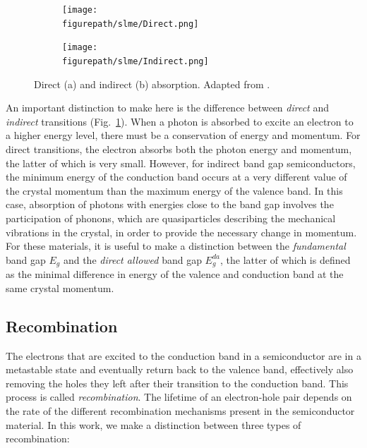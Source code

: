 \begin{refsection}
\begin{figure}[ht]  
\centering 
\begin{subfigure}{0.50\textwidth} 
\centering 
\texttt{[image: \\figurepath/slme/Direct.png]} 
\caption{} 
\end{subfigure}%
\begin{subfigure}{0.50\textwidth} 
\centering 
\texttt{[image: \\figurepath/slme/Indirect.png]} 
\caption{} 
\end{subfigure} 
\caption{\label{slme:fig-abstypes}Direct (a) and indirect (b) absorption. 
Adapted from \cite{Green1981}.} 
\end{figure} 
 
An important distinction to make here is the difference 
between \textit{direct} and \textit{indirect} transitions 
(Fig.~\ref{slme:fig-abstypes}). When a photon is absorbed to excite an 
electron to a higher energy level, there must be a conservation of energy and 
momentum. For direct transitions, the electron absorbs both the photon energy 
and momentum, the latter of which is very small. However, for indirect band 
gap semiconductors, the minimum energy of the conduction band occurs at a very 
different value of the crystal momentum than the maximum energy of the valence 
band. In this case, absorption of photons with energies close to the band gap 
involves the participation of phonons, which are quasiparticles describing the 
mechanical vibrations in the crystal, in order to provide the necessary change 
in momentum. For these materials, it is useful to make a distinction between 
the \textit{fundamental} band gap $E_g$ and the \textit{direct allowed} band 
gap $E_g^{da}$, the latter of which is defined as the minimal difference in 
energy of the valence and conduction band at the same crystal momentum. 
 
\subsection{Recombination}\label{slme:sec-recombination} 
 
The electrons that are excited to the conduction band in a semiconductor are 
in a metastable state and eventually return back to the valence band, 
effectively also removing the holes they left after their transition to the 
conduction band. This process is called \textit{recombination}. The lifetime 
of an electron-hole pair depends on the rate of the different recombination 
mechanisms present in the semiconductor material. In this work, we make a 
distinction between three types of recombination: 
 

\end{refsection}
